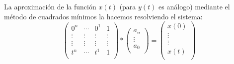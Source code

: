 La aproximación de la función $x(t)$ (para $y(t)$ es análogo) mediante el método de cuadrados mínimos la hacemos resolviendo el sistema:
\begin{displaymath}
\begin{pmatrix}
  0^n & \cdots    & 0^1 & 1	\\
  \vdots &  \vdots &  \vdots & \vdots  \\ 
  \vdots &  \vdots &  \vdots & \vdots  \\ 
  t^n & \cdots & t^1 & 1\\
\end{pmatrix}
*
\begin{pmatrix}
 a_n\\
 \vdots\\
 a_0\\
\end{pmatrix}
 =
\begin{pmatrix}
  x(0)\\
  \vdots \\
  \vdots \\
  x(t)\\ 
\end{pmatrix} 
\end{displaymath}

